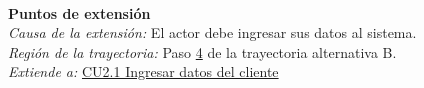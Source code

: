 \noindent \textbf{\\Puntos de extensión}\\

\noindent \textit{Causa de la extensión:} El actor debe ingresar sus datos al sistema.\\
\textit{Región de la trayectoria:} Paso \hyperlink{CU1:TAB:P4}{4} de la trayectoria alternativa B.\\
\textit{Extiende a:} \hyperlink{CU2.1}{CU2.1 Ingresar datos del cliente}\\

